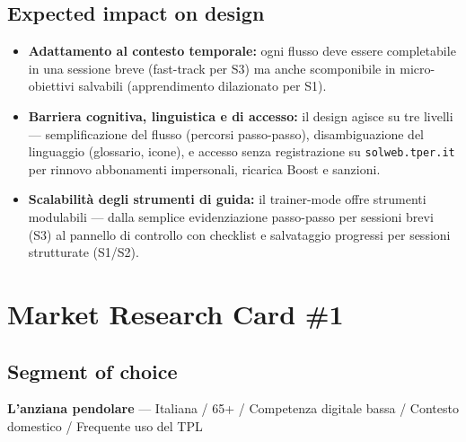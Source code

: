 \documentclass[11pt,a4paper]{article}
\begin{document}
\vspace{0.4cm}

\subsection{Expected impact on design}

\begin{itemize}[leftmargin=*,itemsep=6pt]

    \item \textbf{Adattamento al contesto temporale:}
    ogni flusso deve essere completabile in una sessione breve
    (fast-track per S3) ma anche scomponibile in micro-obiettivi
    salvabili (apprendimento dilazionato per S1).

    \item \textbf{Barriera cognitiva, linguistica e di accesso:}
    il design agisce su tre livelli --- semplificazione del flusso
    (percorsi passo-passo), disambiguazione del linguaggio (glossario,
    icone), e accesso senza registrazione su \texttt{solweb.tper.it}
    per rinnovo abbonamenti impersonali, ricarica Boost e sanzioni.

    \item \textbf{Scalabilità degli strumenti di guida:}
    il trainer-mode offre strumenti modulabili --- dalla semplice
    evidenziazione passo-passo per sessioni brevi (S3) al pannello di
    controllo con checklist e salvataggio progressi per sessioni
    strutturate (S1/S2).

\end{itemize}

\newpage 

\section*{Market Research Card \#1}

\subsection*{Segment of choice}
\begin{tcolorbox}[colback=backgroundColor,colframe=borderColor,arc=2mm]
\textbf{L'anziana pendolare} --- Italiana / 65+ / Competenza digitale
bassa / Contesto domestico / Frequente uso del TPL
\end{tcolorbox}
\end{document}
